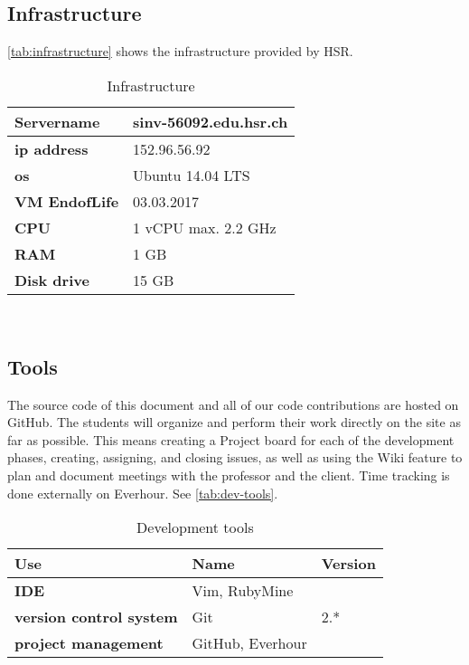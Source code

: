 \subsection{Infrastructure}
\autoref{tab:infrastructure} shows the infrastructure provided by HSR.
\begin{table}[H]
  \centering
  \scriptsize
  \begin{tabular}{|p{25mm}|p{30mm}|}
    \hline 	\bf Servername & sinv-56092.edu.hsr.ch \\ \hline
	\bf ip address & 152.96.56.92 \\ \hline
	\bf os & Ubuntu 14.04 LTS \\ \hline
	\bf VM EndofLife & 03.03.2017 \\ \hline
	\bf CPU & 1 vCPU max. 2.2 GHz \\ \hline
	\bf RAM & 1 GB \\ \hline
	\bf Disk drive & 15 GB \\ \hline
  \end{tabular} \\
  \caption{Infrastructure}
  \label{tab:infrastructure}
\end{table}

\subsection{Tools}
The source code of this document and all of our code contributions are hosted
on GitHub. The students will organize and perform their work directly on the
site as far as possible. This means creating a Project board for each of the
development phases, creating, assigning, and closing issues, as well as using
the Wiki feature to plan and document meetings with the professor and the
client. Time tracking is done externally on Everhour. See
\autoref{tab:dev-tools}.

\begin{table}[H]
  \centering
  \scriptsize
  \begin{tabular}{|p{50mm}|p{15mm}|p{15mm}|}
    \hline 	\bf Use & Name & Version \\ \hline
	\bf IDE & Vim, RubyMine &  \\ \hline
	\bf version control system & Git & 2.* \\ \hline
	\bf project management  & GitHub, Everhour &  \\ \hline
  \end{tabular} \\
  \caption{Development tools}
  \label{tab:dev-tools}
\end{table}

